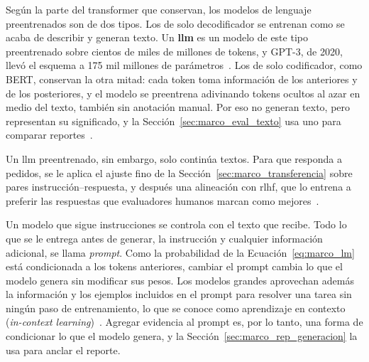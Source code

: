 Según la parte del transformer que conservan, los modelos de lenguaje preentrenados son de dos tipos. Los de
solo decodificador se entrenan como se acaba de describir y generan texto. Un \textbf{\gls{llm}} es un modelo de
este tipo preentrenado sobre cientos de miles de millones de tokens, y GPT-3, de 2020, llevó el esquema a 175 mil
millones de parámetros~\cite{brown2020language}. Los de solo codificador, como BERT, conservan la otra mitad:
cada token toma información de los anteriores y de los posteriores, y el modelo se preentrena adivinando tokens
ocultos al azar en medio del texto, también sin anotación manual. Por eso no generan texto, pero representan su
significado, y la Sección~\ref{sec:marco_eval_texto} usa uno para comparar reportes~\cite{devlin2019bert}.

Un \gls{llm} preentrenado, sin embargo, solo continúa textos. Para que responda a pedidos, se le aplica el ajuste fino de la Sección~\ref{sec:marco_transferencia} sobre pares
instrucción--respuesta, y después una alineación con \gls{rlhf}, que lo entrena a preferir las respuestas que
evaluadores humanos marcan como mejores~\cite{ouyang2022training}.

Un modelo que sigue instrucciones se controla con el texto que recibe. Todo lo que se le entrega antes de
generar, la instrucción y cualquier información adicional, se llama \emph{prompt}. Como la probabilidad de la
Ecuación~\ref{eq:marco_lm} está condicionada a los tokens anteriores, cambiar el prompt cambia lo que el modelo
genera sin modificar sus pesos. Los modelos grandes aprovechan además la información y los ejemplos incluidos en
el prompt para resolver una tarea sin ningún paso de entrenamiento, lo que se conoce como aprendizaje en
contexto (\emph{in-context learning})~\cite{brown2020language}. Agregar evidencia al prompt es, por lo tanto, una
forma de condicionar lo que el modelo genera, y la Sección~\ref{sec:marco_rep_generacion} la usa para anclar el
reporte.

